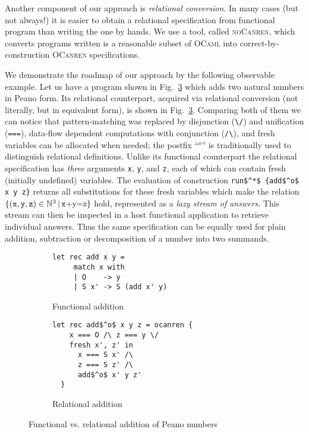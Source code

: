 Another component of our approach is \emph{relational conversion}. In many cases (but not always!) it is easier to obtain a relational specification
from functional program than writing the one by hands. We use a tool, called \textsc{noCanren}, which converts programs written is a reasonable
subset of \textsc{OCaml} into correct-by-construction\cite{conversion} \textsc{OCanren} specifications.

We demonstrate the roadmap of our approach by the following observable example. Let us have a program
shown in Fig.~\ref{fun_vs_rel} which adds two natural numbers in Peano form. Its relational counterpart,
acquired via relational conversion (not literally, but in equivalent form), is shown in Fig.~\ref{fun_vs_rel}.
Comparing both of them we can notice that pattern-matching was replaced by disjunction (\lstinline[language=ocanren,basicstyle=\small]|\/|)
and unification (\lstinline[language=ocanren,basicstyle=\small]|===|), data-flow dependent computations with conjunction (\lstinline[language=ocanren,basicstyle=\small]|/\|),
and fresh variables can be allocated when needed; the postfix ``$^o$'' is traditionally used to distinguish relational definitions. Unlike its functional
counterpart the relational specification has \emph{three} arguments \lstinline[language=ocanren,basicstyle=\small]|x|, \lstinline[language=ocanren,basicstyle=\small]|y|,
and \lstinline[language=ocanren,basicstyle=\small]|z|, each of which can contain fresh (initially undefined) variables.
The evaluation of construction \lstinline[language=ocanren,basicstyle=\small]|run$^*$ {add$^o$ x y z}| returns all substitutions for these
fresh variables which make the relation $\{(\mbox{\texttt x}, \mbox{\texttt y}, \mbox{\texttt z})\in\mathbb{N}^3\, |\, \mbox{\texttt x+y=z}\}$ hold, represented as a \emph{lazy stream of answers}. This stream can
then be inspected in a host functional application to retrieve individual answers. Thus the same specification can be equally used for plain addition,
subtraction or decomposition of a number into two summands.

\begin{figure}[t]
  \begin{subfigure}[t]{0.5\textwidth}
  \begin{lstlisting}[language=ocanren,basicstyle=\small]
   let rec add x y =
     match x with
     | O    -> y
     | S x' -> S (add x' y)
  \end{lstlisting}
  \caption{Functional addition}
  \label{funadd}
  \end{subfigure}
  \begin{subfigure}[t]{0.5\textwidth}
    \begin{lstlisting}[language=ocanren,basicstyle=\small]
  let rec add$^o$ x y z = ocanren {
    x === O /\ z === y \/
    fresh x', z' in
      x === S x' /\
      z === S z' /\
      add$^o$ x' y z'
  }
    \end{lstlisting}
    \caption{Relational addition}
    \label{reladd}
  \end{subfigure}
  \caption{Functional vs. relational addition of Peano numbers}
  \label{fun_vs_rel}
\end{figure}
